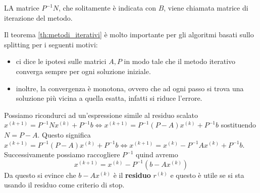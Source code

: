 \begin{definizione}
    LA matrice $P^{-1}N$, che solitamente è indicata con $B$, viene chiamata matrice
    di iterazione del metodo.
\end{definizione}

Il teorema \ref{th:metodi_iterativi} è molto importante per gli algoritmi basati
sullo splitting per i seguenti motivi:
\begin{itemize}
    \item ci dice le ipotesi sulle matrici $A, P$ in modo tale che il metodo iterativo
          converga sempre per ogni soluzione iniziale.
    \item inoltre, la convergenza è monotona, ovvero che ad ogni passo si trova
          una soluzione più vicina a quella esatta, infatti si riduce l'errore.
\end{itemize}

Possiamo ricondurci ad un'espressione simile al residuo scalato
$ x^{(k+1)}= P^{-1}Nx^{(k)}+P^{-1}b \iff x^{(k+1)} = P^{-1}(P-A)x^{(k)}+P^{-1}b$
sostituendo $N=P-A$. Questo significa $ x^{(k+1)} = P^{-1}(P-A)x^{(k)}+P^{-1}b\iff
    x^{(k+1)} = x^{(k)}-P^{-1}Ax^{(k)}+P^{-1}b$. Successivamente possiamo
raccogliere $P^{-1}$ quind avremo
$$x^{(k+1)} = x^{(k)}-P^{-1}(b-Ax^{(k)})$$
Da questo si evince che $b-Ax^{(k)}$ è il \textbf{residuo} $r^{(k)}$ e questo è
utile se si sta usando il residuo come criterio di stop.

